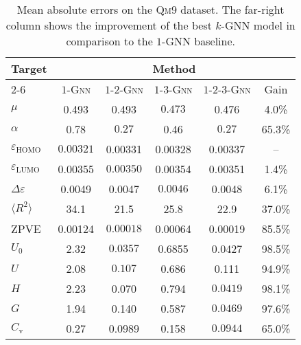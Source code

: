 \documentclass[letterpaper]{article}
\theoremstyle{definition}
\begin{document}
\begin{table*}[t]\
	\caption{Mean absolute errors on the \textsc{Qm9} dataset. The far-right column shows the improvement of the best $k$-GNN model in comparison to the $1$-GNN baseline.
	}\label{fig:qm9_results}
	\renewcommand{\arraystretch}{1.0}
	\centering
	\begin{tabular}{lccccc}
		\toprule
		\multirow{3}{*}{\vspace*{8pt}\textbf{Target}} & \multicolumn{5}{c}{\textbf{Method}} \\
		\cmidrule{2-6}
		&   \textsc{$1$-Gnn}   & \!\textsc{$1$-$2$-Gnn} & \textsc{$1$-$3$-Gnn} & \textsc{$1$-$2$-$3$-Gnn}\! & Gain   \\
		\midrule
		$\mu$                                      & 0.493              & 0.493                  & $\mathbf{0.473}$     & 0.476                      & 4.0\%  \\
		$\alpha$                                                   & 0.78               & $\mathbf{0.27}$        & 0.46                 & $\mathbf{0.27}$            & 65.3\% \\
		$\varepsilon_{\text{HOMO}}$            & $\mathbf{0.00321}$ & 0.00331                & 0.00328              & 0.00337                    & --     \\
		$\varepsilon_{\text{LUMO}}$                  & 0.00355            & $\mathbf{0.00350}$     & 0.00354              & 0.00351                    & 1.4\%  \\
		$\Delta\varepsilon$                           & 0.0049             & 0.0047                 & $\mathbf{0.0046}$    & 0.0048                     & 6.1\%  \\
		$\langle R^2 \rangle$                       & 34.1               & 21.5                   & 25.8                 & 22.9                       & 37.0\% \\
		\textsc{ZPVE}                      & 0.00124            & $\mathbf{0.00018}$     & 0.00064              & 0.00019                    & 85.5\% \\
		$U_0$                                         & 2.32               & $\mathbf{0.0357}$      & 0.6855               & 0.0427                     & 98.5\% \\
		$U$                                                 & 2.08               & $\mathbf{0.107}$       & 0.686                & 0.111                      & 94.9\% \\
		$H$                                                      & 2.23               & 0.070                  & 0.794                & $\mathbf{0.0419}$          & 98.1\% \\
		$G$                                              & 1.94               & 0.140                  & 0.587                & $\mathbf{0.0469}$          & 97.6\% \\
		$C_{\text{v}}$                                & 0.27               & 0.0989                 & 0.158                & $\mathbf{0.0944}$          & 65.0\% \\
		\bottomrule
	\end{tabular}
\end{table*}
\end{document}
